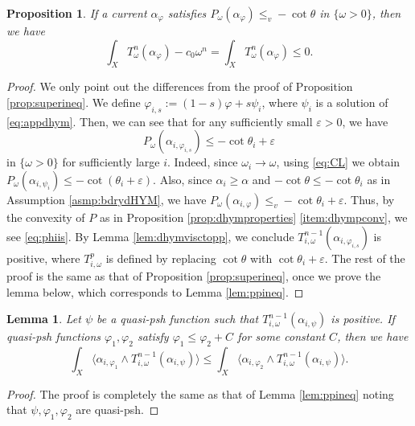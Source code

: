 \documentclass{amsart}
\numberwithin{equation}{section}
\theoremstyle{plain}
\newtheorem{prop}[equation]{Proposition}
\newtheorem{lem}[equation]{Lemma}
\theoremstyle{definition}
\theoremstyle{remark}
\begin{document}
\begin{prop}\label{prop:dhymsuperineq}
    If a current $\alpha_\varphi$ satisfies $P_\omega(\alpha_\varphi)\le_v-\cot\theta$ in $\{\omega>0\}$, then we have
    $$\int_XT^n_\omega(\alpha_\varphi)-c_0\omega^n=\int_XT^n_\omega(\alpha_\varphi)\le0.$$
\end{prop}

\begin{proof}
    We only point out the differences from the proof of Proposition \ref{prop:superineq}. We define $\varphi_{i,s}:=(1-s)\varphi+s\psi_i$, where $\psi_i$ is a solution of \eqref{eq:appdhym}. Then, we can see that for any sufficiently small $\varepsilon>0$, we have \begin{equation}\label{eq:phiis}
        P_\omega(\alpha_{i,\varphi_{i,s}})\le-\cot\theta_i+\varepsilon
    \end{equation} in $\{\omega>0\}$ for sufficiently large $i$. Indeed, since $\omega_i\to\omega$, using \eqref{eq:CL} we obtain $P_\omega(\alpha_{i,\psi_i})\le-\cot(\theta_i+\varepsilon)$. Also, since $\alpha_i\ge\alpha$ and $-\cot\theta\le-\cot\theta_i$ as in Assumption \ref{asmp:bdrydHYM}, we have $P_\omega(\alpha_{i,\varphi})\le_v-\cot\theta_i+\varepsilon$. Thus, by the convexity of $P$ as in Proposition \ref{prop:dhymproperties} \ref{item:dhympconv}, we see \eqref{eq:phiis}. By Lemma \ref{lem:dhymvisctopp}, we conclude $T^{n-1}_{i,\omega}(\alpha_{i,\varphi_{i,s}})$ is positive, where $T^p_{i,\omega}$ is defined by replacing $\cot\theta$ with $\cot\theta_i+\varepsilon$.
    The rest of the proof is the same as that of Proposition \ref{prop:superineq}, once we prove the lemma below, which corresponds to Lemma \ref{lem:ppineq}.
\end{proof}

\begin{lem}
    Let $\psi$ be a quasi-psh function such that $T^{n-1}_{i,\omega}(\alpha_{i,\psi})$ is positive. If quasi-psh functions $\varphi_1,\varphi_2$ satisfy $\varphi_1\le\varphi_2+C$ for some constant $C$, then we have 
    $$\int_X\big\langle\alpha_{i,\varphi_1}\wedge T^{n-1}_{i,\omega}(\alpha_{i,\psi})\big\rangle\le\int_X\big\langle\alpha_{i,\varphi_2}\wedge T^{n-1}_{i,\omega}(\alpha_{i,\psi})\big\rangle.$$
\end{lem}

\begin{proof}
    The proof is completely the same as that of Lemma \ref{lem:ppineq} noting that $\psi,\varphi_1,\varphi_2$ are quasi-psh.
\end{proof}
\end{document}
